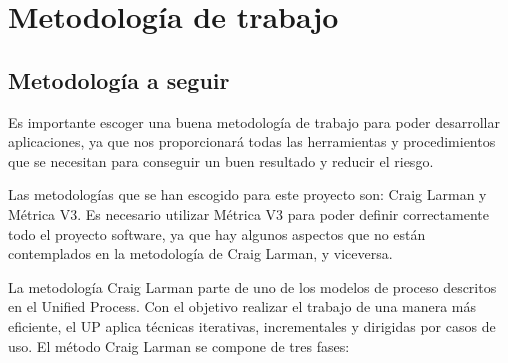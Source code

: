 


\section{Metodología de trabajo}
\subsection {Metodología a seguir}
\par Es importante escoger una buena metodología de trabajo para poder desarrollar aplicaciones, ya que nos proporcionará todas las herramientas y procedimientos que se necesitan para conseguir un buen resultado y reducir el riesgo.
\par Las metodologías que se han escogido para este proyecto son: Craig Larman y Métrica V3. Es necesario utilizar Métrica V3 para poder definir correctamente todo el proyecto software, ya que hay algunos aspectos que no están contemplados en la metodología de Craig Larman, y viceversa.
\par La metodología Craig Larman parte de uno de los modelos de proceso descritos en el Unified Process. Con el objetivo realizar el trabajo de una manera más eficiente, el UP aplica técnicas iterativas, incrementales y dirigidas por casos de uso. El método Craig Larman se compone de tres fases:
